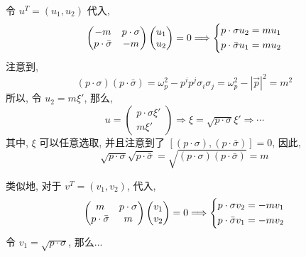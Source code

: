\begin{itemize}
	\begin{tcolorbox}[title=proof:]
		令 $u^T = (u_1, u_2)$ 代入,
		\begin{equation}
			\begin{pmatrix}
				- m & p \cdot \sigma \\
				p \cdot \bar{\sigma} & - m
			\end{pmatrix} \begin{pmatrix}
				u_1 \\
				u_2
			\end{pmatrix} = 0 \Longrightarrow \begin{dcases}
				p \cdot \sigma u_2 = m u_1 \\
				p \cdot \bar{\sigma} u_1 = m u_2
			\end{dcases}
		\end{equation}
		注意到,
		\begin{equation}
			(p \cdot \sigma) (p \cdot \bar{\sigma}) = \omega_p^2 - p^i p^j \sigma_i \sigma_j = \omega_p^2 - |\vec{p}|^2 = m^2
		\end{equation}
		所以, 令 $u_2 = m \xi'$, 那么,
		\begin{equation}
			u = \begin{pmatrix}
				p \cdot \sigma \xi' \\
				m \xi'
			\end{pmatrix} \Longrightarrow \xi = \sqrt{p \cdot \sigma} \xi' \Longrightarrow \cdots
		\end{equation}
		其中, $\xi$ 可以任意选取, 并且注意到了 $[(p \cdot \sigma), (p \cdot \bar{\sigma})] = 0$, 因此,
		\begin{equation}
			\sqrt{p \cdot \sigma} \sqrt{p \cdot \bar{\sigma}} = \sqrt{(p \cdot \sigma) (p \cdot \bar{\sigma})} = m
		\end{equation}
		
		\noindent\hdashrule[0.5ex]{\linewidth}{0.5pt}{1mm} %
		
		类似地, 对于 $v^T = (v_1, v_2)$, 代入,
		\begin{equation}
			\begin{pmatrix}
				m & p \cdot \sigma \\
				p \cdot \bar{\sigma} & m
			\end{pmatrix} \begin{pmatrix}
				v_1 \\
				v_2
			\end{pmatrix} = 0 \Longrightarrow \begin{dcases}
				p \cdot \sigma v_2 = - m v_1 \\
				p \cdot \bar{\sigma} v_1 = - m v_2
			\end{dcases}
		\end{equation}
		令 $v_1 = \sqrt{p \cdot \sigma}$, 那么...
		

\end{tcolorbox}
\end{itemize}
